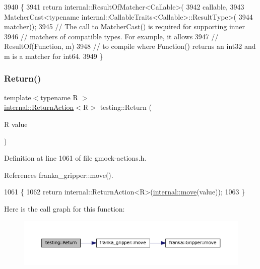 \begin{DoxyCode}
3940                                                        \{
3941   \textcolor{keywordflow}{return} internal::ResultOfMatcher<Callable>(
3942           callable,
3943           MatcherCast<typename internal::CallableTraits<Callable>::ResultType>(
3944               matcher));
3945   \textcolor{comment}{// The call to MatcherCast() is required for supporting inner}
3946   \textcolor{comment}{// matchers of compatible types.  For example, it allows}
3947   \textcolor{comment}{//   ResultOf(Function, m)}
3948   \textcolor{comment}{// to compile where Function() returns an int32 and m is a matcher for int64.}
3949 \}
\end{DoxyCode}
\mbox{\label{namespacetesting_af6d1c13e9376c77671e37545cd84359c}} 
\subsubsection{\texorpdfstring{Return()}{Return()}\hspace{0.1cm}{\footnotesize\ttfamily [1/2]}}
{\footnotesize\ttfamily template$<$typename R $>$ \\
\hyperlink{classtesting_1_1internal_1_1ReturnAction}{internal\+::\+Return\+Action}$<$R$>$ testing\+::\+Return (\begin{DoxyParamCaption}\item[{R}]{value }\end{DoxyParamCaption})}



Definition at line 1061 of file gmock-\/actions.\+h.



References franka\+\_\+gripper\+::move().


\begin{DoxyCode}
1061                                         \{
1062   \textcolor{keywordflow}{return} internal::ReturnAction<R>(\hyperlink{namespacefranka__gripper_a1356a87108d2229401d3755bd3e53bdf}{internal::move}(value));
1063 \}
\end{DoxyCode}
Here is the call graph for this function\+:
\nopagebreak
\begin{figure}[H]
\begin{center}
\leavevmode
\includegraphics[width=350pt]{namespacetesting_af6d1c13e9376c77671e37545cd84359c_cgraph}
\end{center}
\end{figure}
\mbox{\label{namespacetesting_a8da8e53d2e7bc4e3c531f7435ad04823}} 
